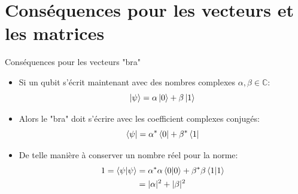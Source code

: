 \documentclass[aspectratio=169,12pt]{beamer}
\begin{document}
\section{Conséquences pour les vecteurs et les matrices}

\begin{frame}{Conséquences pour les vecteurs "bra"}
    \begin{itemize}
        \item Si un qubit s'écrit maintenant avec des nombres complexes $\alpha,\beta\in\mathbb{C}$:
        \begin{equation*}
            \ket{\psi} = \alpha \ket{0} + \beta \ket{1}
        \end{equation*}

        \item Alors le "bra" doit s'écrire avec les coefficient complexes conjugés:
        \begin{equation*}
            \bra{\psi} = \alpha^* \bra{0} + \beta^* \bra{1}
        \end{equation*}

        \item De telle manière à conserver un nombre réel pour la norme: 
        \begin{align*}
            1 = \braket{\psi}{\psi} 
            &= \alpha^*\alpha \braket{0}{0} + \beta^*\beta \braket{1}{1} \\ 
            &= |\alpha|^2 + |\beta|^2
        \end{align*}
    \end{itemize}
\end{frame}
\end{document}
